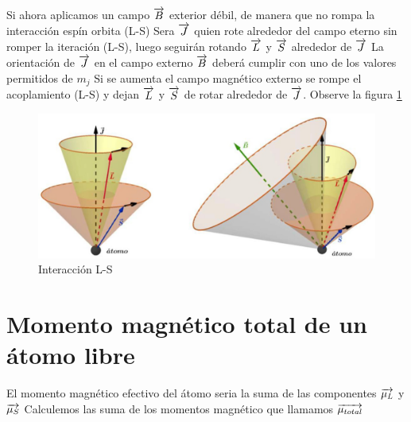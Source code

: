 Si ahora aplicamos un campo $\overrightarrow{B}$ exterior débil, de manera que no rompa la interacción espín orbita (L-S) Sera $\overrightarrow{J}$ quien rote alrededor del campo eterno sin romper la iteración (L-S), luego seguirán rotando $\overrightarrow{L}$ y $\overrightarrow{S}$ alrededor de $\overrightarrow{J}$ La orientación de $\overrightarrow{J}$ en el campo externo $\overrightarrow{B}$  deberá cumplir con uno de los valores permitidos de $m_{j}$ Si se aumenta el campo magnético externo se rompe el acoplamiento (L-S) y dejan $\overrightarrow{L}$ y $\overrightarrow{S}$ de rotar alrededor de $\overrightarrow{J}$. Observe la figura \ref{fig:116} 


\begin{figure}[H]
    \centering
    \includegraphics[width=1.0\textwidth]{./Figures/fig116}
	\caption{Interacción L-S}
	\label{fig:116}
 \end{figure}


\section{Momento magnético total de un átomo libre}

El momento magnético efectivo del átomo seria la suma de las componentes $\overrightarrow{\mu_{L}}$ y $\overrightarrow{\mu_{S}}$ Calculemos las suma de los momentos magnético que llamamos $\overrightarrow{\mu_{total}}$

